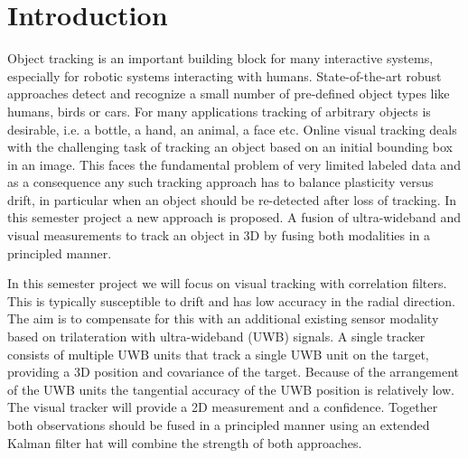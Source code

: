 
\setcounter{chapter}{0}

\chapter{Introduction}

Object tracking is an important building block for	many interactive systems, especially for robotic systems interacting with humans. State-of-the-art robust approaches detect and recognize a small number of pre-defined	object types like humans,	birds	or cars. For	many applications tracking of arbitrary objects	is desirable, i.e. a bottle,	a hand, an animal, a face etc. Online visual tracking deals with the	challenging	task of tracking an object based on an initial bounding box in an image. This faces the fundamental problem of very limited labeled data and as a consequence any such tracking approach has to balance plasticity	versus drift, in particular when an object	should	be re-detected after loss of tracking. In this semester project a new approach is proposed. A fusion of ultra-wideband and visual	measurements to track an object in 3D by fusing both modalities in a principled manner.

In this semester project we will focus on visual tracking with correlation filters. This is typically susceptible to drift and has low accuracy in the radial direction. The aim is to compensate for this with an additional existing sensor modality based on trilateration with ultra-wideband (UWB) signals. A single tracker consists of multiple UWB units that track a single UWB unit on the target, providing a 3D position and covariance of the target. Because of the arrangement of the UWB units the tangential accuracy of the UWB position is relatively low. The visual tracker will provide a 2D measurement and a confidence. Together both observations should be fused in a principled manner using an extended Kalman filter hat will combine the strength of both approaches.